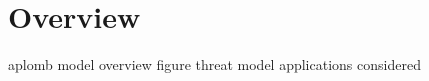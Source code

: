 \section{Overview}\label{sec:overview}

aplomb model
overview figure
threat model
applications considered
